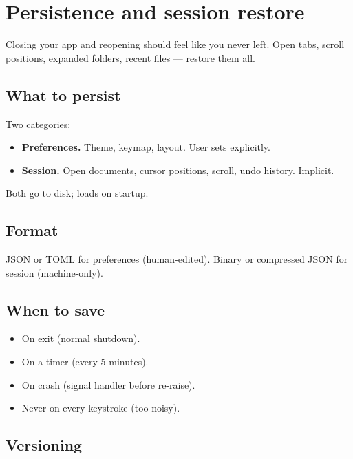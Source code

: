 \chapter{Persistence and session restore}
\label{ch:persistence}

\begin{aside}
Closing your app and reopening should feel like you never
left. Open tabs, scroll positions, expanded folders, recent
files --- restore them all.
\end{aside}

\section{What to persist}

Two categories:

\begin{itemize}[leftmargin=*]
  \item \textbf{Preferences.} Theme, keymap, layout. User
    sets explicitly.
  \item \textbf{Session.} Open documents, cursor positions,
    scroll, undo history. Implicit.
\end{itemize}

Both go to disk; loads on startup.

\section{Format}

JSON or TOML for preferences (human-edited). Binary or
compressed JSON for session (machine-only).

\section{When to save}

\begin{itemize}[leftmargin=*]
  \item On exit (normal shutdown).
  \item On a timer (every 5 minutes).
  \item On crash (signal handler before re-raise).
  \item Never on every keystroke (too noisy).
\end{itemize}

\section{Versioning}

